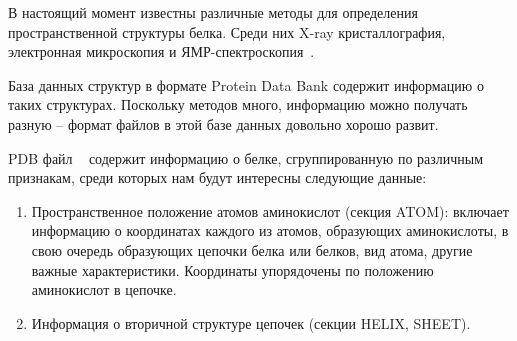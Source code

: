 В настоящий момент известны различные методы для определения пространственной структуры белка. Среди них X-ray кристаллография, электронная микроскопия и ЯМР-спектроскопия~\cite{konf_analiz_belkov}.

База данных структур в формате Protein Data Bank\cite{rcsb} содержит информацию о таких структурах. Поскольку методов много, информацию можно получать разную -- формат файлов в этой базе данных довольно хорошо развит.

PDB файл ~\cite{pdb} содержит информацию о белке, сгруппированную по различным признакам, среди которых нам будут интересны следующие данные: 
\begin{enumerate}
\item Пространственное положение атомов аминокислот (секция ATOM):
включает информацию о координатах каждого из атомов, образующих аминокислоты, в свою очередь образующих цепочки белка или белков, вид атома, другие важные характеристики. Координаты упорядочены по положению аминокислот в цепочке.

\item Информация о вторичной структуре цепочек (секции HELIX, SHEET).
\end{enumerate}





